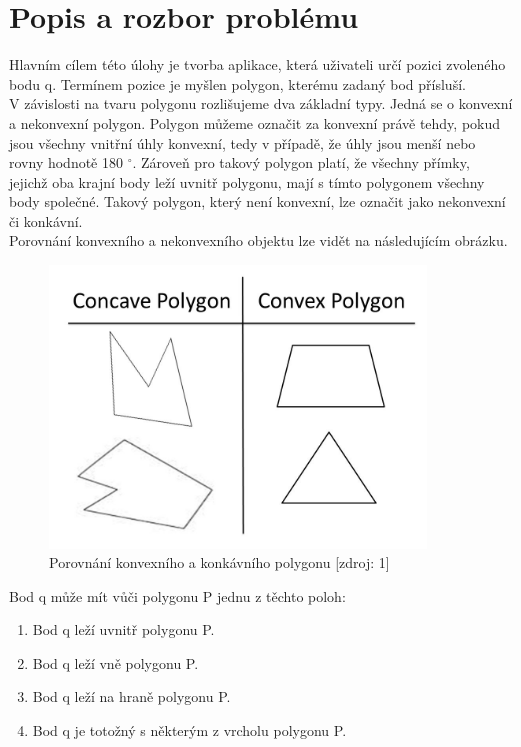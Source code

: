 \documentclass[a4paper, 12pt]{article}
\begin{document}
\section{Popis a rozbor problému}
Hlavním cílem této úlohy je tvorba aplikace, která uživateli určí pozici zvoleného bodu q. Termínem pozice je myšlen polygon, kterému zadaný bod přísluší.
\\

V závislosti na tvaru polygonu rozlišujeme dva základní typy. Jedná se o konvexní a nekonvexní polygon. Polygon můžeme označit za konvexní právě tehdy, pokud jsou všechny vnitřní úhly konvexní, tedy v případě, že úhly jsou menší nebo rovny hodnotě 180 $^\circ$. Zároveň pro takový polygon platí, že všechny přímky, jejichž oba krajní body leží uvnitř polygonu, mají s tímto polygonem všechny body společné. Takový polygon, který není konvexní, lze označit jako nekonvexní či konkávní.
\\

Porovnání konvexního a nekonvexního objektu lze vidět na následujícím obrázku.
\begin{figure}[h]
	\centering
	\includegraphics[width=10cm]{typy_polygonu.jpg}
	\caption{Porovnání konvexního a konkávního polygonu [zdroj: 1]}
\end{figure}

Bod q může mít vůči polygonu P jednu z těchto poloh:
\begin{enumerate}
\item Bod q leží uvnitř polygonu P.
\item Bod q leží vně polygonu P.
\item Bod q leží na hraně polygonu P.
\item Bod q je totožný s některým z vrcholu polygonu P.
\end{enumerate}
\end{document}
